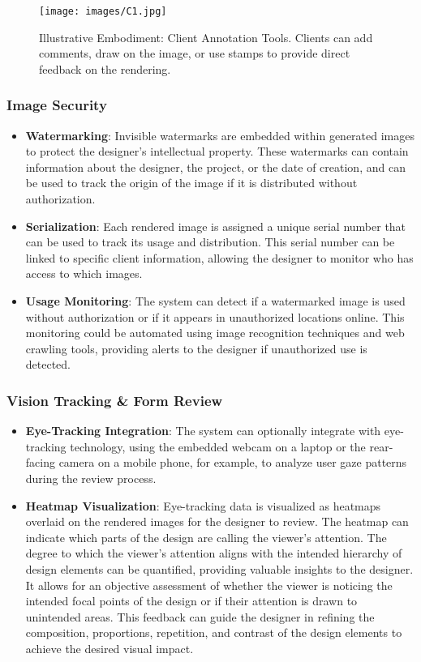 \begin{figure}
\centering
\texttt{[image: images/C1.jpg]}
\caption{Illustrative Embodiment: Client Annotation Tools. Clients can add comments, draw on the image, or use stamps to provide direct feedback on the rendering.}
\label{fig:client-annotation}
\end{figure}

\subsubsection{Image Security}
\begin{itemize}
\item \textbf{Watermarking}: Invisible watermarks are embedded within generated images to protect the designer's intellectual property. These watermarks can contain information about the designer, the project, or the date of creation, and can be used to track the origin of the image if it is distributed without authorization.
\item \textbf{Serialization}: Each rendered image is assigned a unique serial number that can be used to track its usage and distribution. This serial number can be linked to specific client information, allowing the designer to monitor who has access to which images.
\item \textbf{Usage Monitoring}: The system can detect if a watermarked image is used without authorization or if it appears in unauthorized locations online. This monitoring could be automated using image recognition techniques and web crawling tools, providing alerts to the designer if unauthorized use is detected.
\end{itemize}

\subsubsection{Vision Tracking & Form Review}
\begin{itemize}
\item \textbf{Eye-Tracking Integration}: The system can optionally integrate with eye-tracking technology, using the embedded webcam on a laptop or the rear-facing camera on a mobile phone, for example, to analyze user gaze patterns during the review process.
\item \textbf{Heatmap Visualization}: Eye-tracking data is visualized as heatmaps overlaid on the rendered images for the designer to review. The heatmap can indicate which parts of the design are calling the viewer's attention. The degree to which the viewer's attention aligns with the intended hierarchy of design elements can be quantified, providing valuable insights to the designer. It allows for an objective assessment of whether the viewer is noticing the intended focal points of the design or if their attention is drawn to unintended areas. This feedback can guide the designer in refining the composition, proportions, repetition, and contrast of the design elements to achieve the desired visual impact.
\end{itemize}

